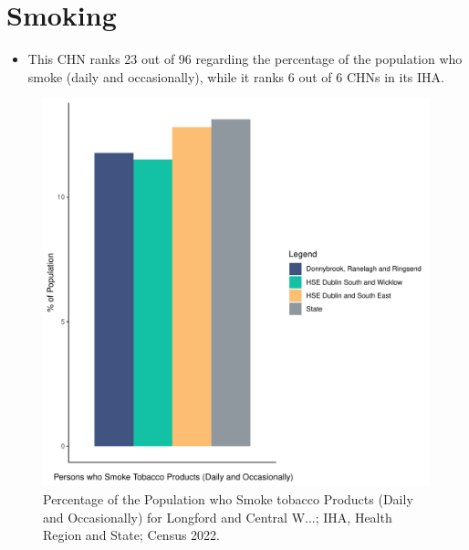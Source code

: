 \documentclass{article}
\begin{document}
\pagebreak

\section{Smoking}\label{sect:Smoking}
\begin{itemize}
\item This CHN ranks  23 out of 96 regarding the percentage of the population who smoke (daily and occasionally), while it ranks   6 out of 6 CHNs in its IHA.
\end{itemize}
\begin{figure}[H]
	\centering
	\includegraphics[width = 120mm]{../figures/SmokingED.pdf}
	\caption{Percentage of the Population who Smoke tobacco Products (Daily and Occasionally) for Longford and Central W...; IHA, Health Region and State; Census 2022.}
	\label{fig:2ae19629-1a6a-13a3-e055-000000000001}
	\end{figure}
	
\end{document}
